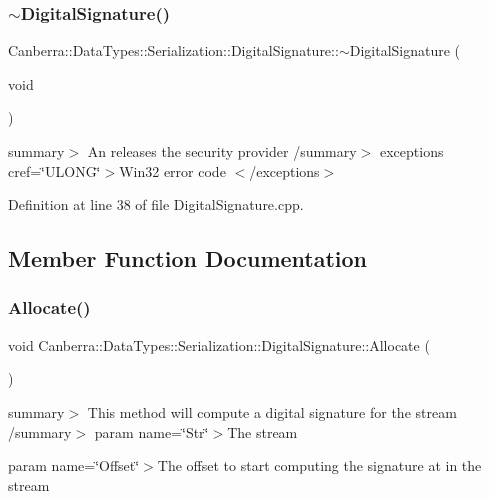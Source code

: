 \subsubsection{\texorpdfstring{$\sim$\+Digital\+Signature()}{~DigitalSignature()}}
{\footnotesize\ttfamily Canberra\+::\+Data\+Types\+::\+Serialization\+::\+Digital\+Signature\+::$\sim$\+Digital\+Signature (\begin{DoxyParamCaption}\item[{void}]{ }\end{DoxyParamCaption})\hspace{0.3cm}{\ttfamily [virtual]}}

summary$>$ An releases the security provider /summary$>$ exceptions cref=\char`\"{}\+U\+L\+O\+N\+G\char`\"{}$>$Win32 error code $<$/exceptions$>$ 

Definition at line 38 of file Digital\+Signature.\+cpp.



\subsection{Member Function Documentation}
\mbox{\label{class_canberra_1_1_data_types_1_1_serialization_1_1_digital_signature_a66f229a0fa24c0429e46d5db733049a2_a66f229a0fa24c0429e46d5db733049a2}} 
\subsubsection{\texorpdfstring{Allocate()}{Allocate()}}
{\footnotesize\ttfamily void Canberra\+::\+Data\+Types\+::\+Serialization\+::\+Digital\+Signature\+::\+Allocate (\begin{DoxyParamCaption}{ }\end{DoxyParamCaption})\hspace{0.3cm}{\ttfamily [protected]}}

summary$>$ This method will compute a digital signature for the stream /summary$>$ param name=\char`\"{}\+Str\char`\"{}$>$The stream

param name=\char`\"{}\+Offset\char`\"{}$>$The offset to start computing the signature at in the stream

